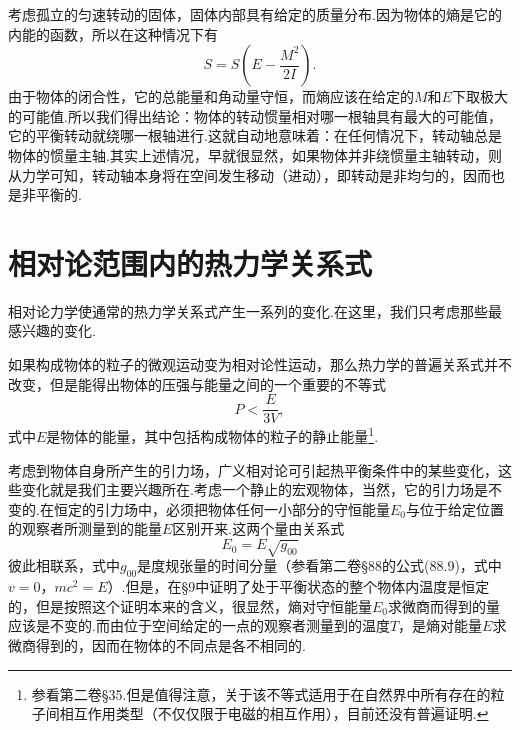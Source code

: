 考虑孤立的匀速转动的固体，固体内部具有给定的质量分布.因为物体的熵是它的内能的函数，所以在这种情况下有
\begin{equation*}
  S=S\left(E-\frac{M^2}{2I}\right).
\end{equation*}
由于物体的闭合性，它的总能量和角动量守恒，而熵应该在给定的$M$和$E$下取极大的可能值.所以我们得出结论：物体的转动惯量相对哪一根轴具有最大的可能值，它的平衡转动就绕哪一根轴进行.这就自动地意味着：在任何情况下，转动轴总是物体的惯量主轴.其实上述情况，早就很显然，如果物体并非绕惯量主轴转动，则从力学可知，转动轴本身将在空间发生移动（进动），即转动是非均匀的，因而也是非平衡的.

\section{相对论范围内的热力学关系式}

相对论力学使通常的热力学关系式产生一系列的变化.在这里，我们只考虑那些最感兴趣的变化.

如果构成物体的粒子的微观运动变为相对论性运动，那么热力学的普遍关系式并不改变，但是能得出物体的压强与能量之间的一个重要的不等式
\begin{equation}
  P<\frac{E}{3V},
\end{equation}
式中$E$是物体的能量，其中包括构成物体的粒子的静止能量\footnote{参看第二卷§35.但是值得注意，关于该不等式适用于在自然界中所有存在的粒子间相互作用类型（不仅仅限于电磁的相互作用），目前还没有普遍证明.}.

考虑到物体自身所产生的引力场，广义相对论可引起热平衡条件中的某些变化，这些变化就是我们主要兴趣所在.考虑一个静止的宏观物体，当然，它的引力场是不变的.在恒定的引力场中，必须把物体任何一小部分的守恒能量$E_0$与位于给定位置的观察者所测量到的能量$E$区别开来.这两个量由关系式
\begin{equation*}
  E_0=E\sqrt{g_{00}}
\end{equation*}
彼此相联系，式中$g_{00}$是度规张量的时间分量（参看第二卷§88的公式(88.9)，式中$v=0$，$mc^2=E$）.但是，在§9中证明了处于平衡状态的整个物体内温度是恒定的，但是按照这个证明本来的含义，很显然，熵对守恒能量$E_0$求微商而得到的量应该是不变的.而由位于空间给定的一点的观察者测量到的温度$T$，是熵对能量$E$求微商得到的，因而在物体的不同点是各不相同的.

